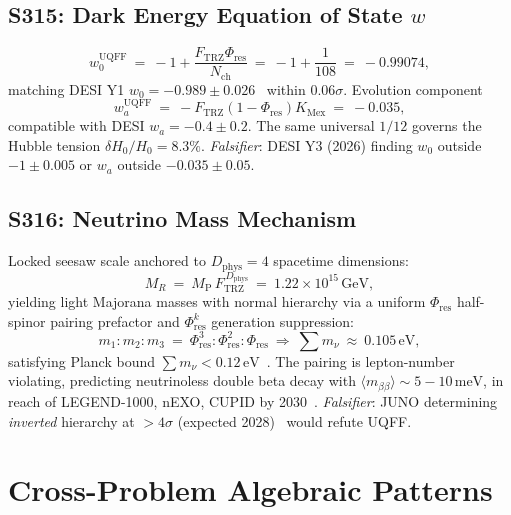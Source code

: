\documentclass[11pt]{article}
\newcommand{\Ftrz}{F_{\mathrm{TRZ}}}
\newcommand{\Phires}{\Phi_{\mathrm{res}}}
\newcommand{\KMex}{K_{\mathrm{Mex}}}
\newcommand{\Dphys}{D_{\mathrm{phys}}}
\newcommand{\Nch}{N_{\mathrm{ch}}}
\newcommand{\mP}{M_{\mathrm{P}}}
\begin{document}
\subsection{S315: Dark Energy Equation of State $w$}

\begin{equation}
w_0^{\text{UQFF}}\ =\ -1 + \frac{\Ftrz\Phires}{\Nch}\ =\ -1+\frac{1}{108}\ =\ -0.99074,
\end{equation}
matching DESI Y1 $w_0=-0.989\pm0.026$~\cite{DESI2024} within $0.06\sigma$. Evolution component
\begin{equation}
w_a^{\text{UQFF}}\ =\ -\Ftrz(1-\Phires)\KMex\ =\ -0.035,
\end{equation}
compatible with DESI $w_a=-0.4\pm0.2$. The same universal $1/12$ governs the Hubble tension $\delta H_0/H_0=8.3\%$. \emph{Falsifier}: DESI Y3 (2026) finding $w_0$ outside $-1\pm0.005$ or $w_a$ outside $-0.035\pm0.05$.

\subsection{S316: Neutrino Mass Mechanism}

Locked seesaw scale anchored to $\Dphys=4$ spacetime dimensions:
\begin{equation}
M_R\ =\ \mP\,\Ftrz^{\,\Dphys}\ =\ 1.22\times10^{15}\,\text{GeV},
\end{equation}
yielding light Majorana masses with normal hierarchy via a uniform $\Phires$ half-spinor pairing prefactor and $\Phires^k$ generation suppression:
\begin{equation}
m_1:m_2:m_3\ =\ \Phires^{3}:\Phires^{2}:\Phires\ \Longrightarrow\ \sum m_\nu\ \approx\ 0.105\,\text{eV},
\end{equation}
satisfying Planck bound $\sum m_\nu<0.12\,\text{eV}$~\cite{PlanckCosmo}. The pairing is lepton-number violating, predicting neutrinoless double beta decay with $\langle m_{\beta\beta}\rangle\sim5-10\,\text{meV}$, in reach of LEGEND-1000, nEXO, CUPID by 2030~\cite{nEXO}. \emph{Falsifier}: JUNO determining \emph{inverted} hierarchy at $>4\sigma$ (expected 2028)~\cite{JUNO} would refute UQFF.

\section{Cross-Problem Algebraic Patterns}
\end{document}

